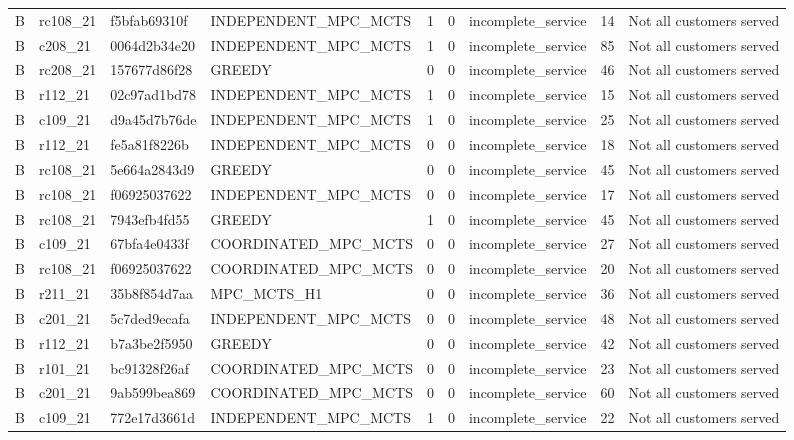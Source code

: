 \begin{table}
{\begin{tabular}{llllrrlrl}
B & rc108\_21 & f5bfab69310f & INDEPENDENT\_MPC\_MCTS & 1 & 0 & incomplete\_service & 14 & Not all customers served \\
B & c208\_21 & 0064d2b34e20 & INDEPENDENT\_MPC\_MCTS & 1 & 0 & incomplete\_service & 85 & Not all customers served \\
B & rc208\_21 & 157677d86f28 & GREEDY & 0 & 0 & incomplete\_service & 46 & Not all customers served \\
B & r112\_21 & 02c97ad1bd78 & INDEPENDENT\_MPC\_MCTS & 1 & 0 & incomplete\_service & 15 & Not all customers served \\
B & c109\_21 & d9a45d7b76de & INDEPENDENT\_MPC\_MCTS & 1 & 0 & incomplete\_service & 25 & Not all customers served \\
B & r112\_21 & fe5a81f8226b & INDEPENDENT\_MPC\_MCTS & 0 & 0 & incomplete\_service & 18 & Not all customers served \\
B & rc108\_21 & 5e664a2843d9 & GREEDY & 0 & 0 & incomplete\_service & 45 & Not all customers served \\
B & rc108\_21 & f06925037622 & INDEPENDENT\_MPC\_MCTS & 0 & 0 & incomplete\_service & 17 & Not all customers served \\
B & rc108\_21 & 7943efb4fd55 & GREEDY & 1 & 0 & incomplete\_service & 45 & Not all customers served \\
B & c109\_21 & 67bfa4e0433f & COORDINATED\_MPC\_MCTS & 0 & 0 & incomplete\_service & 27 & Not all customers served \\
B & rc108\_21 & f06925037622 & COORDINATED\_MPC\_MCTS & 0 & 0 & incomplete\_service & 20 & Not all customers served \\
B & r211\_21 & 35b8f854d7aa & MPC\_MCTS\_H1 & 0 & 0 & incomplete\_service & 36 & Not all customers served \\
B & c201\_21 & 5c7ded9ecafa & INDEPENDENT\_MPC\_MCTS & 0 & 0 & incomplete\_service & 48 & Not all customers served \\
B & r112\_21 & b7a3be2f5950 & GREEDY & 0 & 0 & incomplete\_service & 42 & Not all customers served \\
B & r101\_21 & bc91328f26af & COORDINATED\_MPC\_MCTS & 0 & 0 & incomplete\_service & 23 & Not all customers served \\
B & c201\_21 & 9ab599bea869 & COORDINATED\_MPC\_MCTS & 0 & 0 & incomplete\_service & 60 & Not all customers served \\
B & c109\_21 & 772e17d3661d & INDEPENDENT\_MPC\_MCTS & 1 & 0 & incomplete\_service & 22 & Not all customers served \\

\end{tabular}}
\end{table}
